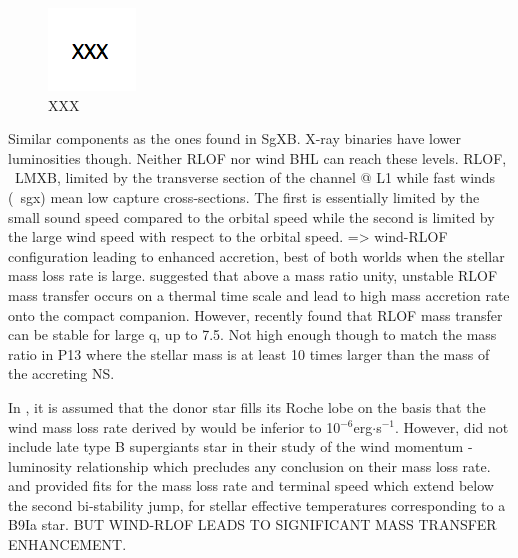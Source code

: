 \documentclass[letter]{aa}
\makeatletter
\newcommand{\sgx}{SgXB\xspace}
\newcommand*{\ns}{NS\@\xspace}
\makeatother
\begin{document}
\begin{figure}
\centering
\includegraphics[width=0.99\columnwidth]{Pictures/BHL.png}
\caption{XXX}
\label{fig:BHL}
\end{figure}

Similar components as the ones found in \sgx. X-ray binaries have lower luminosities though. Neither RLOF nor wind BHL can reach these levels. RLOF, ~LMXB, limited by the transverse section of the channel @ L1 while fast winds (~sgx) mean low capture cross-sections. The first is essentially limited by the small sound speed compared to the orbital speed while the second is limited by the large wind speed with respect to the orbital speed. => wind-RLOF configuration leading to enhanced accretion, best of both worlds when the stellar mass loss rate is large. \cite{King2002} suggested that above a mass ratio unity, unstable RLOF mass transfer occurs on a thermal time scale and lead to high mass accretion rate onto the compact companion. However, \cite{Pavlovskii2017} recently found that RLOF mass transfer can be stable for large q, up to 7.5. Not high enough though to match the mass ratio in P13 where the stellar mass is at least 10 times larger than the mass of the accreting \ns.

In \cite{Motch2014}, it is assumed that the donor star fills its Roche lobe on the basis that the wind mass loss rate derived by \cite{Kudritzki1999} would be inferior to 10$^{-6}$erg$\cdot$s$^{-1}$. However, \cite{Kudritzki1999} did not include late type B supergiants star in their study of the wind momentum - luminosity relationship which precludes any conclusion on their mass loss rate. \cite{Vink2000} and \cite{Vink2001} provided fits for the mass loss rate and terminal speed which extend below the second bi-stability jump, for stellar effective temperatures corresponding to a B9Ia star. BUT WIND-RLOF LEADS TO SIGNIFICANT MASS TRANSFER ENHANCEMENT.
\end{document}
